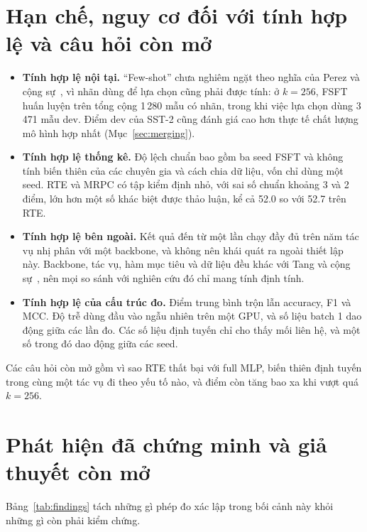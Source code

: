 \section{Hạn chế, nguy cơ đối với tính hợp lệ và câu hỏi còn mở}

\begin{itemize}
  \item \textbf{Tính hợp lệ nội tại.} ``Few-shot'' chưa nghiêm ngặt theo nghĩa của Perez và cộng sự~\cite{perez2021truefewshot}, vì nhãn dùng để lựa chọn cũng phải được tính: ở $k=256$, FSFT huấn luyện trên tổng cộng 1\,280 mẫu có nhãn, trong khi việc lựa chọn dùng 3\,471 mẫu dev. Điểm dev của SST-2 cũng đánh giá cao hơn thực tế chất lượng mô hình hợp nhất (Mục~\ref{sec:merging}).
  \item \textbf{Tính hợp lệ thống kê.} Độ lệch chuẩn bao gồm ba seed FSFT và không tính biến thiên của các chuyên gia và cách chia dữ liệu, vốn chỉ dùng một seed. RTE và MRPC có tập kiểm định nhỏ, với sai số chuẩn khoảng 3 và 2 điểm, lớn hơn một số khác biệt được thảo luận, kể cả 52.0 so với 52.7 trên RTE.
  \item \textbf{Tính hợp lệ bên ngoài.} Kết quả đến từ một lần chạy đầy đủ trên năm tác vụ nhị phân với một backbone, và không nên khái quát ra ngoài thiết lập này. Backbone, tác vụ, hàm mục tiêu và dữ liệu đều khác với Tang và cộng sự~\cite{tang2024wemoe}, nên mọi so sánh với nghiên cứu đó chỉ mang tính định tính.
  \item \textbf{Tính hợp lệ của cấu trúc đo.} Điểm trung bình trộn lẫn accuracy, F1 và MCC. Độ trễ dùng đầu vào ngẫu nhiên trên một GPU, và số liệu batch 1 dao động giữa các lần đo. Các số liệu định tuyến chỉ cho thấy mối liên hệ, và một số trong đó dao động giữa các seed.
\end{itemize}

Các câu hỏi còn mở gồm vì sao RTE thất bại với full MLP, biến thiên định tuyến trong cùng một tác vụ đi theo yếu tố nào, và điểm còn tăng bao xa khi vượt quá $k=256$.

\section{Phát hiện đã chứng minh và giả thuyết còn mở}

Bảng~\ref{tab:findings} tách những gì phép đo xác lập trong bối cảnh này khỏi những gì còn phải kiểm chứng.

